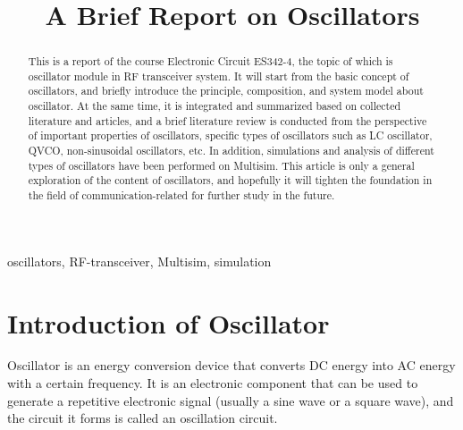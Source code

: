 \documentclass[conference]{IEEEtran}
\begin{document}
\title{A Brief Report on Oscillators\\
}

\author{

}

\maketitle
\thispagestyle{fancy} 
\lhead{} %
\chead{} %
\rhead{} %
\lfoot{} %
\cfoot{\thepage} %
\rfoot{} %
\renewcommand{\headrulewidth}{0pt} %
\renewcommand{\footrulewidth}{0pt} %
\pagestyle{fancy}
\cfoot{\thepage}

\begin{abstract}
This is a report of the course Electronic Circuit ES342-4, the topic of which is oscillator module in RF transceiver system. It will start from the basic concept of oscillators, and briefly introduce the principle, composition, and system model about oscillator. At the same time, it is integrated and summarized based on collected literature and articles, and a brief literature review is conducted from the perspective of important properties of oscillators, specific types of oscillators such as LC oscillator, QVCO, non-sinusoidal oscillators, etc. In addition, simulations and analysis of different types of oscillators have been performed on Multisim. This article is only a general exploration of the content of oscillators, and hopefully it will tighten the foundation in the field of communication-related for further study in the future. 
\end{abstract}

\begin{IEEEkeywords}
oscillators, RF-transceiver, Multisim, simulation
\end{IEEEkeywords}

\section{Introduction of Oscillator}\label{sec1}
Oscillator is an energy conversion device that converts DC energy into AC energy with a certain frequency. It is an electronic component that can be used to generate a repetitive electronic signal (usually a sine wave or a square wave), and the circuit it forms is called an oscillation circuit.
\end{document}
